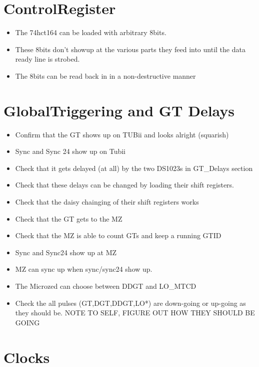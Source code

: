\documentclass[11pt,a4paper]{article}
\begin{document}
\section {ControlRegister}
\begin{itemize}
\item The 74hct164 can be loaded with arbitrary 8bits.
\item These 8bits don't showup at the  various parts they feed into until the data
ready line is strobed.
\item The 8bits can be read back in in a non-destructive manner
\end{itemize}
\section{GlobalTriggering and GT Delays}
\begin{itemize}
\item Confirm that the GT shows up on TUBii and looks alright (squarish)
\item Sync and Sync 24 show up on Tubii
\item Check that it gets delayed (at all) by the two DS1023s in GT\_Delays section
\item Check that these delays can be changed by loading their shift registers.
\item Check that the daisy chainging of their shift registers works
\item Check that the GT gets to the MZ
\item Check that the MZ is able to count GTs and keep a running GTID
\item Sync and Sync24 show up at MZ
\item MZ can sync up when sync/sync24 show up.
\item The Microzed can choose between DDGT and LO\_MTCD
\item Check the all pulses (GT,DGT,DDGT,LO*) are down-going or up-going as they 
should be. NOTE TO SELF, FIGURE OUT HOW THEY SHOULD BE GOING
\end{itemize}
\section{Clocks}
\end{document}
